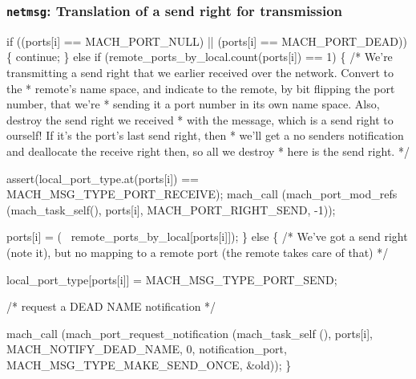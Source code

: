 \documentclass{beamer}
\begin{document}
\begin{frame}[fragile]
\frametitle{{\tt netmsg}: Translation of a send right for transmission}
\begin{semiverbatim}
\tiny
if ((ports[i] == MACH_PORT_NULL) || (ports[i] == MACH_PORT_DEAD))
  \{
    continue;
  \}
else if (remote_ports_by_local.count(ports[i]) == 1)
  \{
    /* We're transmitting a send right that we earlier received over the network.  Convert to the
     * remote's name space, and indicate to the remote, by bit flipping the port number, that we're
     * sending it a port number in its own name space.  Also, destroy the send right we received
     * with the message, which is a send right to ourself!  If it's the port's last send right, then
     * we'll get a no senders notification and deallocate the receive right then, so all we destroy
     * here is the send right.
     */

    assert(local_port_type.at(ports[i]) == MACH_MSG_TYPE_PORT_RECEIVE);
    mach_call (mach_port_mod_refs (mach_task_self(), ports[i],
                                   MACH_PORT_RIGHT_SEND, -1));

    ports[i] = (~ remote_ports_by_local[ports[i]]);
  \}
else
  \{
    /* We've got a send right (note it), but no mapping to a remote port (the remote takes care of that) */

    local_port_type[ports[i]] = MACH_MSG_TYPE_PORT_SEND;

    /* request a DEAD NAME notification */

    mach_call (mach_port_request_notification (mach_task_self (), ports[i],
                                               MACH_NOTIFY_DEAD_NAME, 0,
                                               notification_port, MACH_MSG_TYPE_MAKE_SEND_ONCE, &old));
  \}
\end{semiverbatim}
\end{frame}
\end{document}
